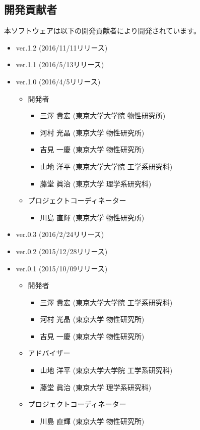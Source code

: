 \subsection{開発貢献者}
\label{subsec:developers}
本ソフトウェアは以下の開発貢献者により開発されています。
\begin{itemize}
\item{ver.1.2 (2016/11/11リリース)}
\item{ver.1.1 (2016/5/13リリース)}
\item{ver.1.0 (2016/4/5リリース)}
\begin{itemize}
\item{開発者}
	\begin{itemize}
	\item{三澤 貴宏 (東京大学大学院 物性研究所)}
	\item{河村 光晶 (東京大学 物性研究所)}
	\item{吉見 一慶 (東京大学 物性研究所)}
	\item{山地 洋平 (東京大学大学院 工学系研究科)}
	\item{藤堂 眞治 (東京大学 理学系研究科)}
	\end{itemize}
\item{プロジェクトコーディネーター}
	\begin{itemize}
	\item{川島 直輝 (東京大学 物性研究所)}
	\end{itemize}

\end{itemize}

\item{ver.0.3 (2016/2/24リリース)}
\item{ver.0.2 (2015/12/28リリース)}
\item{ver.0.1 (2015/10/09リリース)}
\begin{itemize}
\item{開発者}
	\begin{itemize}
	\item{三澤 貴宏 (東京大学大学院 工学系研究科)}
	\item{河村 光晶 (東京大学 物性研究所)}
	\item{吉見 一慶 (東京大学 物性研究所)}
	\end{itemize}
\item{アドバイザー}
	\begin{itemize}
	\item{山地 洋平 (東京大学大学院 工学系研究科)}
	\item{藤堂 眞治 (東京大学 理学系研究科)}
	\end{itemize}
\item{プロジェクトコーディネーター}
	\begin{itemize}
	\item{川島 直輝 (東京大学 物性研究所)}
	\end{itemize}

\end{itemize}
\end{itemize}


